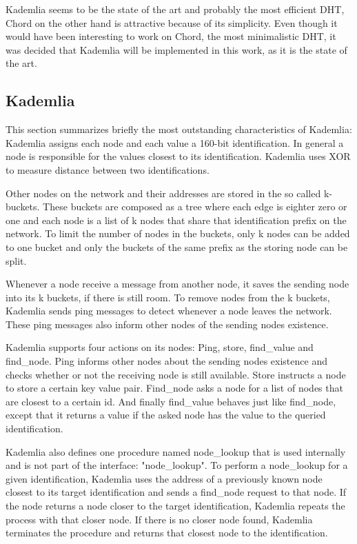\documentclass[a4paper, 12pt]{article} %
\begin{document}
Kademlia seems to be the state of the art and probably the most efficient DHT, Chord on the other hand is attractive because of its simplicity. Even though it would have been interesting to work on Chord, the most minimalistic DHT, it was decided that Kademlia will be implemented in this work, as it is the state of the art. 

\subsection{Kademlia}

This section summarizes briefly the most outstanding characteristics of Kademlia: Kademlia assigns each node and each value a 160-bit identification. In general a node is responsible for the values closest to its identification. Kademlia uses XOR to measure distance between two identifications. 

Other nodes on the network and their addresses are stored in the so called k-buckets. These buckets are composed as a tree where each edge is eighter zero or one and each node is a list of k nodes that share that identification prefix on the network. To limit the number of nodes in the buckets, only k nodes can be added to one bucket and only the buckets of the same prefix as the storing node can be split. 

Whenever a node receive a message from another node, it saves the sending node into its k buckets, if there is still room. To remove nodes from the k buckets, Kademlia sends ping messages to detect whenever a node leaves the network. These ping messages also inform other nodes of the sending nodes existence.

Kademlia supports four actions on its nodes: Ping, store, find\_value and find\_node. Ping informs other nodes about the sending nodes existence and checks whether or not the receiving node is still available. Store instructs a node to store a certain key value pair. Find\_node asks a node for a list of nodes that are closest to a certain id. And finally find\_value behaves just like find\_node, except that it returns a value if the asked node has the value to the queried identification.

Kademlia also defines one procedure named node\_lookup that is used internally and is not part of the interface: "node\_lookup". To perform a node\_lookup for a given identification, Kademlia uses the address of a previously known node closest to its target identification and sends a find\_node request to that node. If the node returns a node closer to the target identification, Kademlia repeats the process with that closer node. If there is no closer node found, Kademlia terminates the procedure and returns that closest node to the identification.
\end{document}
